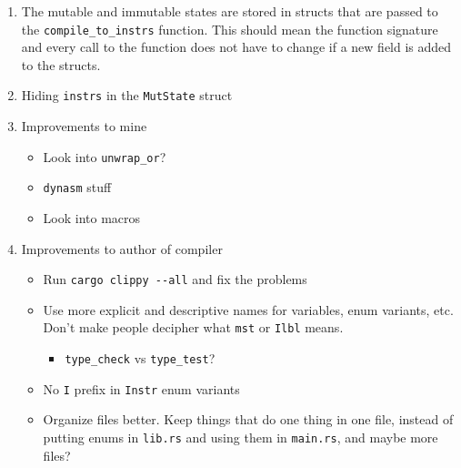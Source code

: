 	\begin{enumerate}
		\item The mutable and immutable states are stored in structs that are passed to the \verb|compile_to_instrs| function. This should mean the function signature and every call to the function does not have to change if a new field is added to the structs.
		\item Hiding \verb|instrs| in the \verb|MutState| struct
		\item Improvements to mine
			\begin{itemize}
				\item Look into \verb|unwrap_or|?
				\item \verb|dynasm| stuff
				\item Look into macros
			\end{itemize}
		\item Improvements to author of compiler
			\begin{itemize}
				\item Run \verb|cargo clippy --all| and fix the problems
				\item Use more explicit and descriptive names for variables, enum variants, etc. Don't make people decipher what \verb|mst| or \verb|Ilbl| means.
					\begin{itemize}
						\item \verb|type_check| vs \verb|type_test|?
					\end{itemize}
				\item No \verb|I| prefix in \verb|Instr| enum variants
				\item Organize files better. Keep things that do one thing in one file, instead of putting enums in \verb|lib.rs| and using them in \verb|main.rs|, and maybe more files?
			\end{itemize}
	\end{enumerate}


